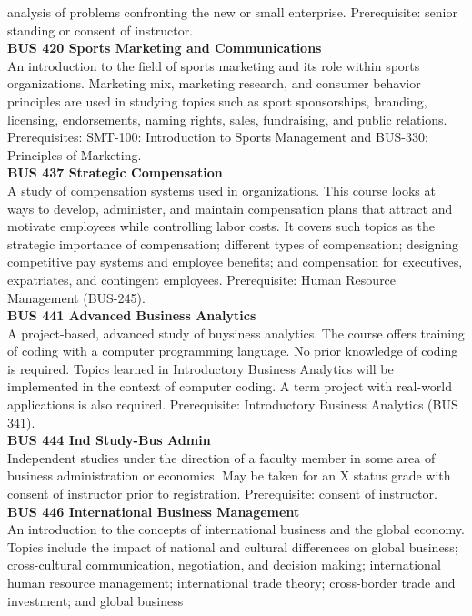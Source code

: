 \documentclass[
  letterpaper,
]{scrbook}
\begin{document}
analysis of problems confronting the new or small enterprise.
Prerequisite: senior standing or consent of instructor.\\
\textbf{BUS 420 Sports Marketing and Communications}\\
An introduction to the field of sports marketing and its role within
sports organizations. Marketing mix, marketing research, and consumer
behavior principles are used in studying topics such as sport
sponsorships, branding, licensing, endorsements, naming rights, sales,
fundraising, and public relations. Prerequisites: SMT-100: Introduction
to Sports Management and BUS-330: Principles of Marketing.\\
\textbf{BUS 437 Strategic Compensation}\\
A study of compensation systems used in organizations. This course looks
at ways to develop, administer, and maintain compensation plans that
attract and motivate employees while controlling labor costs. It covers
such topics as the strategic importance of compensation; different types
of compensation; designing competitive pay systems and employee
benefits; and compensation for executives, expatriates, and contingent
employees. Prerequisite: Human Resource Management (BUS-245).\\
\textbf{BUS 441 Advanced Business Analytics}\\
A project-based, advanced study of buysiness analytics. The course
offers training of coding with a computer programming language. No prior
knowledge of coding is required. Topics learned in Introductory Business
Analytics will be implemented in the context of computer coding. A term
project with real-world applications is also required. Prerequisite:
Introductory Business Analytics (BUS 341).\\
\textbf{BUS 444 Ind Study-Bus Admin}\\
Independent studies under the direction of a faculty member in some area
of business administration or economics. May be taken for an X status
grade with consent of instructor prior to registration. Prerequisite:
consent of instructor.\\
\textbf{BUS 446 International Business Management}\\
An introduction to the concepts of international business and the global
economy. Topics include the impact of national and cultural differences
on global business; cross-cultural communication, negotiation, and
decision making; international human resource management; international
trade theory; cross-border trade and investment; and global business
\end{document}
